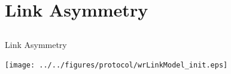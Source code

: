 \documentclass[compress,red]{beamer}
\begin{document}
\section{Link Asymmetry}
\subsection{}
\begin{frame}{Link Asymmetry}

  \begin{center}
  \texttt{[image: ../../figures/protocol/wrLinkModel\_init.eps]}
  \end{center}

\end{frame}

\end{document}
